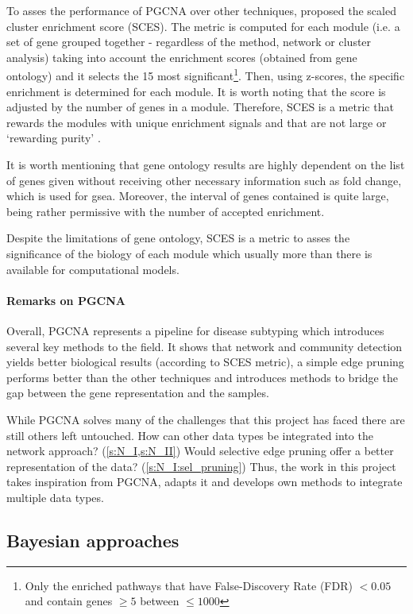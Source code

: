 To asses the performance of PGCNA over other techniques, \citet{Care2019-ij} proposed the scaled cluster enrichment score (SCES). The metric is computed for each module (i.e. a set of gene grouped together - regardless of the method, network or cluster analysis) taking into account the enrichment scores (obtained from gene ontology) and it selects the 15 most significant\footnote{Only the enriched pathways that have False-Discovery Rate (FDR) $<0.05$ and contain genes $\geq5$ between $\leq1000$}. Then, using z-scores, the specific enrichment is determined for each module. It is worth noting that the score is adjusted by the number of genes in a module. Therefore, SCES is a metric that rewards the modules with unique enrichment signals and that are not large or ‘rewarding purity' \citep{Care2019-ij}.

It is worth mentioning that gene ontology results are highly dependent on the list of genes given without receiving other necessary information such as fold change, which is used for \acrlong{gsea}. Moreover, the interval of genes contained is quite large, being rather permissive with the number of accepted enrichment.

Despite the limitations of gene ontology, SCES is a metric to asses the significance of the biology of each module which usually more than there is available for computational models.


\paragraph*{Remarks on PGCNA}

Overall, PGCNA represents a pipeline for disease subtyping which introduces several key methods to the field. It shows that network and community detection yields better biological results (according to SCES metric), a simple edge pruning performs better than the other techniques and introduces methods to bridge the gap between the gene representation and the samples.

While PGCNA solves many of the challenges that this project has faced there are still others left untouched. How can other data types be integrated into the network approach? (\cref{s:N_I,s:N_II}) Would selective edge pruning offer a better representation of the data? (\cref{s:N_I:sel_pruning}) Thus, the work in this project takes inspiration from PGCNA, adapts it and develops own methods to integrate multiple data types.

\subsection{Bayesian approaches} \label{s:lit:bayesian}

